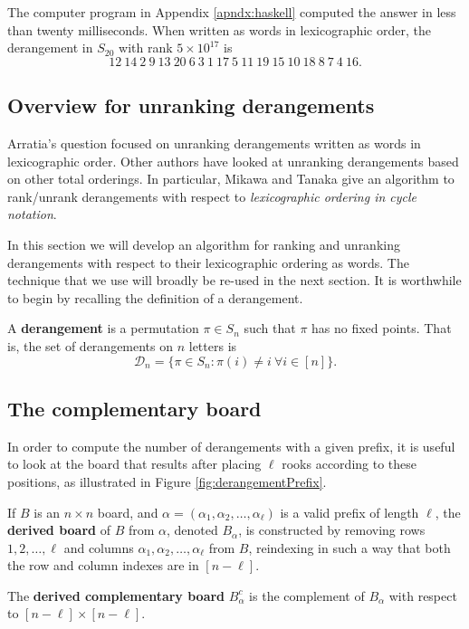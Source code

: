 \begin{answer}
The computer program in Appendix \ref{apndx:haskell} computed the answer in
less than twenty milliseconds. When written as words in lexicographic order, the
derangement in $S_{20}$ with rank $5 \times 10^{17}$ is \begin{equation}
  12\ 14\ 2\ 9\ 13\ 20\ 6\ 3\ 1\ 17\ 5\ 11\ 19\ 15\ 10\ 18\ 8\ 7\ 4\ 16.
\end{equation}
\end{answer}

\subsection{Overview for unranking derangements}
Arratia's question focused on unranking derangements written as words in
lexicographic order.
Other authors have looked at unranking derangements based on other total
orderings. In particular, Mikawa and Tanaka \cite{Mikawa2014} give an algorithm
to rank/unrank derangements
with respect to \textit{lexicographic ordering in cycle notation}.

In this section we will develop an algorithm for ranking and unranking
derangements with respect to their lexicographic ordering as words. The
technique that we use will broadly be re-used in the next section.
It is worthwhile to begin by recalling the definition of a derangement.
\begin{definition}
  A \textbf{derangement} is a permutation $\pi \in S_n$ such that $\pi$ has no
  fixed points. That is, the set of derangements on $n$ letters is \begin{equation}
    \mathcal{D}_n = \{\pi \in S_n : \pi(i) \neq i\ \forall i \in [n]\}.
  \end{equation}
\end{definition}

\subsection{The complementary board}
In order to compute the number of derangements with a given prefix, it is
useful to look at the board that results after placing $\ell$ rooks according to
these positions, as illustrated in Figure \ref{fig:derangementPrefix}.



\begin{definition}
  If $B$ is an $n \times n$ board, and
  $\alpha = (\alpha_1, \alpha_2, \dots, \alpha_\ell)$ is a valid prefix of length
  $\ell$, the \textbf{derived board} of $B$ from $\alpha$,
  denoted $B_\alpha$,
  is constructed by removing
  rows $1, 2, \dots, \ell$ and
  columns $\alpha_1, \alpha_2, \dots, \alpha_\ell$ from $B$,
  reindexing in such a way that both the row and column indexes are in
  $[n - \ell]$.

  The \textbf{derived complementary board} $B_\alpha^c$ is the complement of
  $B_\alpha$ with respect to $[n - \ell] \times [n - \ell]$.
\end{definition}

